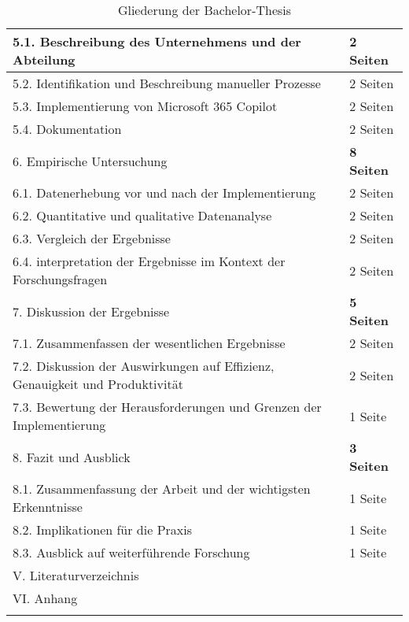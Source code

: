 \begin{longtable}{|p{6cm}|p{6cm}|}
    \hline
        5.1. Beschreibung des Unternehmens und der Abteilung & 2 Seiten \\
        \hline
        5.2. Identifikation und Beschreibung manueller Prozesse & 2 Seiten \\
        \hline
        5.3. Implementierung von Microsoft 365 Copilot & 2 Seiten \\
        \hline
        5.4. Dokumentation & 2 Seiten \\
    \hline
    6. Empirische Untersuchung & \textbf{8 Seiten} \\
    \hline
        6.1. Datenerhebung vor und nach der Implementierung & 2 Seiten \\
        \hline
        6.2. Quantitative und qualitative Datenanalyse & 2 Seiten \\
        \hline
        6.3. Vergleich der Ergebnisse & 2 Seiten \\
        \hline
        6.4. interpretation der Ergebnisse im Kontext der Forschungsfragen & 2 Seiten \\
    \hline
    7. Diskussion der Ergebnisse& \textbf{5 Seiten} \\
    \hline
        7.1. Zusammenfassen der wesentlichen Ergebnisse & 2 Seiten \\
        \hline
        7.2. Diskussion der Auswirkungen auf Effizienz, Genauigkeit und Produktivität & 2 Seiten \\
        \hline
        7.3. Bewertung der Herausforderungen und Grenzen der Implementierung & 1 Seite \\
    \hline
    8. Fazit und Ausblick & \textbf{3 Seiten} \\
    \hline
        8.1. Zusammenfassung der Arbeit und der wichtigsten Erkenntnisse & 1 Seite \\
        \hline
        8.2. Implikationen für die Praxis & 1 Seite \\
        \hline
        8.3. Ausblick auf weiterführende Forschung & 1 Seite \\
    \hline
    V. Literaturverzeichnis \\
    \hline
    VI. Anhang \\
    \caption{Gliederung der Bachelor-Thesis} \label{tab:gliederung} \\
\end{longtable}



\clearpage